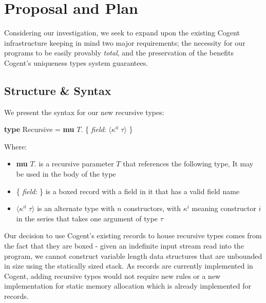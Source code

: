 \chapter{Proposal and Plan}\label{ch:style}

Considering our investigation, we seek to expand upon the existing Cogent infrastructure keeping in mind
two major requirements; the necessity for our programs to be easily provably \textit{total}, and the preservation 
of the benefits Cogent's uniqueness types system guarantees.



\section{Structure \& Syntax}

We present the syntax for our new recursive types:

\begin{center}
    \textbf{type} Recursive = \textbf{mu} $T$. \{ \textit{field}: $\langle \overline{\kappa^n\; \tau} \rangle$ \}
\end{center}

Where:
\begin{itemize}
    \item
        \textbf{mu} $T$. is a recursive parameter $T$ that references the following type,
        It may be used in the body of the type
    \item
        \{ \textit{field}: \} is a boxed record with a field in it that has a valid field name
    \item 
        $\langle \overline{\kappa^n\; \tau} \rangle$ is an alternate type with $n$ constructors, 
        with $\kappa^i$ meaning constructor $i$ in the series that takes one argument of type $\tau$
\end{itemize}

Our decision to use Cogent's existing records to house recursive types comes from the fact that they are boxed - 
given an indefinite input stream read into the program, we cannot construct variable length data structures that
are unbounded in size using the statically sized stack. As records are currently implemented in Cogent,
adding recursive types would not require new rules or a new implementation for static memory allocation which
is already implemented for records.

